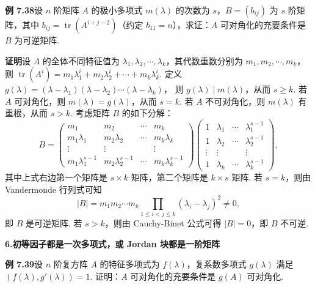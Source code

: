 \documentclass[UTF8,12pt,a4paper,fontset=fandol]{ctexart}
\begin{document}
\noindent\textbf{例 7.38}\quad 设 $n$ 阶矩阵 $A$ 的极小多项式 $m(\lambda)$ 的次数为 $s$，$B=(b_{ij})$ 为 $s$ 阶矩阵，其中 $b_{ij}=\operatorname{tr}(A^{i+j-2})$（约定 $b_{11}=n$），求证：$A$ 可对角化的充要条件是 $B$ 为可逆矩阵.

\noindent\textbf{证明}\quad 设 $A$ 的全体不同特征值为 $\lambda_1,\lambda_2,\cdots,\lambda_k$，其代数重数分别为 $m_1,m_2,\cdots,m_k$，则 $\operatorname{tr}(A^i)=m_1\lambda_1^i+m_2\lambda_2^i+\cdots+m_k\lambda_k^i$. 定义 $g(\lambda)=(\lambda-\lambda_1)(\lambda-\lambda_2)\cdots(\lambda-\lambda_k)$，
则 $g(\lambda)\mid m(\lambda)$，从而 $s\ge k$. 若 $A$ 可对角化，则 $m(\lambda)=g(\lambda)$，从而 $s=k$. 若 $A$ 不可对角化，则 $m(\lambda)$ 有重根，从而 $s>k$. 考虑矩阵 $B$ 的如下分解：
\[
B=
\left(\begin{array}{cccc}
m_1 & m_2 & \cdots & m_k\\
m_1\lambda_1 & m_2\lambda_2 & \cdots & m_k\lambda_k\\
\vdots & \vdots &        & \vdots\\
m_1\lambda_1^{s-1} & m_2\lambda_2^{s-1} & \cdots & m_k\lambda_k^{s-1}
\end{array}\right)
\left(\begin{array}{cccc}
1 & \lambda_1 & \cdots & \lambda_1^{s-1}\\
1 & \lambda_2 & \cdots & \lambda_2^{s-1}\\
\vdots & \vdots &        & \vdots\\
1 & \lambda_k & \cdots & \lambda_k^{s-1}
\end{array}\right),
\]
其中上式右边第一个矩阵是 $s\times k$ 矩阵，第二个矩阵是 $k\times s$ 矩阵. 若 $s=k$，则由 Vandermonde 行列式可知
\[
|B|=m_1m_2\cdots m_k\prod_{1\le i<j\le k}(\lambda_i-\lambda_j)^2\ne 0,
\]
即 $B$ 是可逆矩阵. 若 $s>k$，则由 Cauchy-Binet 公式可得 $|B|=0$，即 $B$ 不可逆.

\noindent\textbf{6.\quad 初等因子都是一次多项式，或 Jordan 块都是一阶矩阵}

\noindent\textbf{例 7.39}\quad 设 $n$ 阶复方阵 $A$ 的特征多项式为 $f(\lambda)$，复系数多项式 $g(\lambda)$ 满足 $(f(\lambda),g'(\lambda))=1$. 证明：$A$ 可对角化的充要条件是 $g(A)$ 可对角化.
\end{document}
